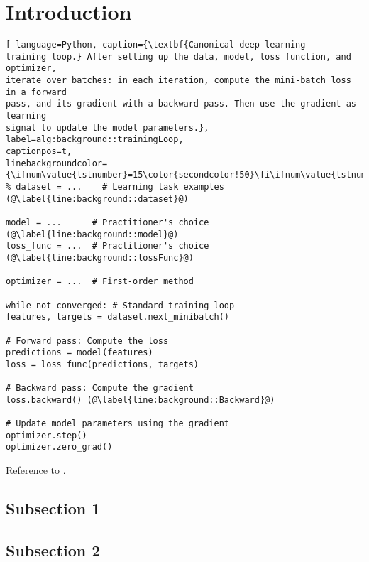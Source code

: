 \section{Introduction}\label{sec:introduction}

\showlocaltoc%
%
\Blindtext

\begin{lstlisting}[ language=Python, caption={\textbf{Canonical deep learning
training loop.} After setting up the data, model, loss function, and optimizer,
iterate over batches: in each iteration, compute the mini-batch loss in a forward
pass, and its gradient with a backward pass. Then use the gradient as learning
signal to update the model parameters.}, label=alg:background::trainingLoop,
captionpos=t,
linebackgroundcolor={\ifnum\value{lstnumber}=15\color{secondcolor!50}\fi\ifnum\value{lstnumber}=16\color{secondcolor!50}\fi}]
% dataset = ...    # Learning task examples (@\label{line:background::dataset}@)

model = ...      # Practitioner's choice (@\label{line:background::model}@)
loss_func = ...  # Practitioner's choice (@\label{line:background::lossFunc}@)

optimizer = ...  # First-order method

while not_converged: # Standard training loop
features, targets = dataset.next_minibatch()

# Forward pass: Compute the loss
predictions = model(features)
loss = loss_func(predictions, targets)

# Backward pass: Compute the gradient
loss.backward() (@\label{line:background::Backward}@)

# Update model parameters using the gradient
optimizer.step()
optimizer.zero_grad()
\end{lstlisting}

Reference to .

\subsection{Subsection 1}

\Blindtext[1]

\subsection{Subsection 2}

